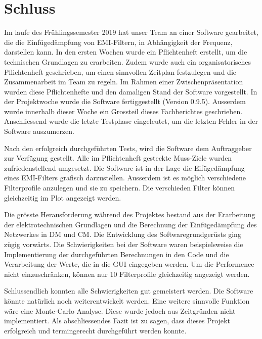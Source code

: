 \section{Schluss} \label{sec:schluss}

Im laufe des Frühlingssemester 2019 hat unser Team an einer Software gearbeitet, die die Einfügedämpfung von EMI-Filtern, in Abhängigkeit der Frequenz, darstellen kann. In den ersten Wochen wurde ein Pflichtenheft erstellt, um die technischen Grundlagen zu erarbeiten. Zudem wurde auch ein organisatorisches Pflichtenheft geschrieben, um einen sinnvollen Zeitplan festzulegen und die Zusammenarbeit im Team zu regeln. 
Im Rahmen einer Zwischenpräsentation wurden diese Pflichtenhefte und den damaligen Stand der Software vorgestellt. In der Projektwoche wurde die Software fertiggestellt (Version 0.9.5). Ausserdem wurde innerhalb dieser Woche ein Grossteil dieses Fachberichtes geschrieben. Anschliessend wurde die letzte Testphase eingeleutet, um die letzten Fehler in der Software auszumerzen.   
 
Nach den erfolgreich durchgeführten Tests, wird die Software dem Auftraggeber zur Verfügung gestellt. Alle im Pflichtenheft gesteckte Muss-Ziele wurden zufriedenstellend umgesetzt. Die Software ist in der Lage die Eifügedämpfung eines EMI-Filters grafisch darzustellen. Ausserdem ist es möglich verschiedene Filterprofile anzulegen und sie zu speichern. Die verschieden Filter können gleichzeitig im Plot angezeigt werden. 

Die grösste Herausforderung während des Projektes bestand aus der Erarbeitung der elektrotechnischen Grundlagen und die Berechnung der Einfügedämpfung des Netzwerkes in DM und CM. Die Entwicklung des Softwaregrundgerüsts ging zügig vorwärts. Die Schwierigkeiten bei der Software waren beispielsweise die Implementierung der durchgeführten Berechnungen in den Code und die Verarbeitung der Werte, die in die GUI eingegeben werden. Um die Performence nicht einzuschränken, können nur 10 Filterprofile gleichzeitig angezeigt werden.

Schlussendlich konnten alle Schwierigkeiten gut gemeistert werden. Die Software könnte natürlich noch weiterentwickelt werden.  Eine weitere sinnvolle Funktion wäre eine Monte-Carlo Analyse. Diese wurde jedoch aus Zeitgründen nicht implementiert. Als abschliessendes Fazit ist zu sagen, dass dieses Projekt erfolgreich und termingerecht durchgeführt werden konnte. 
